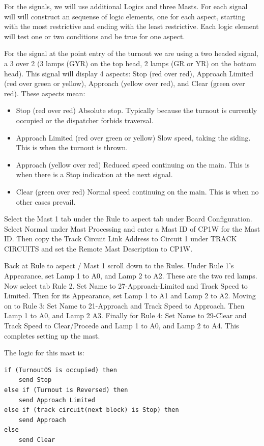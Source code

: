 For the signals, we will use additional Logics and three Masts.  For each 
signal will will construct an sequense of logic elements, one for each aspect, 
starting with the most restrictive and ending with the least restrictive.  
Each logic element will test one or two conditions and be true for one aspect.

For the signal at the point entry of the turnout we are using a two headed
signal, a 3 over 2 (3 lamps (GYR) on the top head, 2 lamps (GR or YR) on the
bottom head). This signal will display 4 aspects: Stop (red over red),
Approach Limited (red over green or yellow), Approach (yellow over red), and 
Clear (green over red).  These aspects mean: 

\begin{itemize}
\item Stop (red over red) Absolute stop.  Typically because the turnout is 
currently occupied or the dispatcher forbids traversal.
\item Approach Limited (red over green or yellow) Slow speed, taking the 
siding.  This is when the turnout is thrown.
\item Approach (yellow over red) Reduced speed continuing on the main.  This 
is when there is a Stop indication at the next signal.
\item  Clear (green over red) Normal speed continuing on the main.  This is 
when no other cases prevail.
\end{itemize}

Select the Mast 1 tab under the Rule to aspect tab under Board Configuration. 
Select Normal under Mast Processing and enter a Mast ID of CP1W for the Mast 
ID.  Then copy the Track Circuit Link Address to Circuit 1 under TRACK 
CIRCUITS and set the Remote Mast Description  to CP1W.

Back at Rule to aspect / Mast 1 scroll down to the Rules. Under Rule 1's
Appearance, set Lamp 1 to A0, and Lamp 2 to A2. These are the two red lamps.
Now select tab Rule 2.  Set Name to 27-Approach-Limited and Track Speed to 
Limited.  Then for its Appearance, set Lamp 1 to A1 and Lamp 2 to A2. Moving 
on to Rule 3: Set Name to 21-Approach and Track Speed to Approach.  Then Lamp 
1 to A0, and Lamp 2 A3.  Finally for Rule 4: Set Name to 29-Clear and Track 
Speed to Clear/Procede and Lamp 1 to A0, and Lamp 2 to A4. This completes 
setting up the mast.

The logic for this mast is:

\begin{verbatim}
if (TurnoutOS is occupied) then
    send Stop
else if (Turnout is Reversed) then
    send Approach Limited
else if (track circuit(next block) is Stop) then
    send Approach
else
    send Clear
\end{verbatim}

